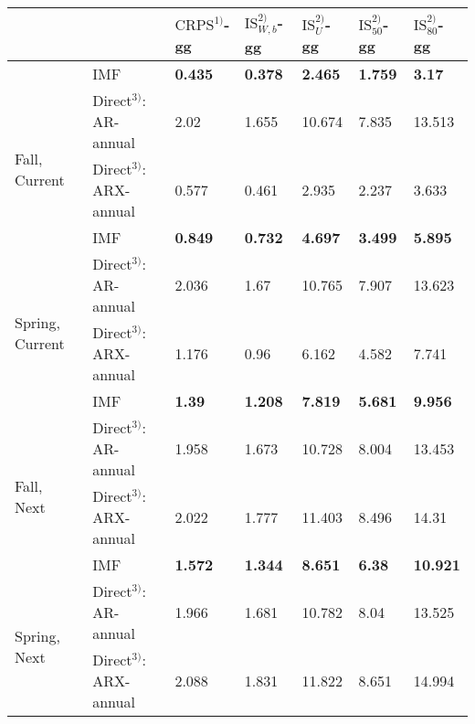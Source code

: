 \begin{table}[!h]
\centering
\begin{tabular}{lllllll}
\toprule
 &  & $\text{CRPS}^{1)}$-gg & $\text{IS}_{W,b}^{2)}$-gg & $\text{IS}_{U}^{2)}$-gg & $\text{IS}_{50}^{2)}$-gg & $\text{IS}_{80}^{2)}$-gg\\
\midrule
 & IMF & \textbf{0.435} & \textbf{0.378} & \textbf{2.465} & \textbf{1.759} & \textbf{3.17}\\
\multirow{3}{*}{Fall, Current}
 & Direct$^{3)}$: AR-annual & 2.02 & 1.655 & 10.674 & 7.835 & 13.513\\
 & Direct$^{3)}$: ARX-annual & 0.577 & 0.461 & 2.935 & 2.237 & 3.633\\
\addlinespace
 & IMF & \textbf{0.849} & \textbf{0.732} & \textbf{4.697} & \textbf{3.499} & \textbf{5.895}\\
\multirow{3}{*}{Spring, Current}
 & Direct$^{3)}$: AR-annual & 2.036 & 1.67 & 10.765 & 7.907 & 13.623\\
 & Direct$^{3)}$: ARX-annual & 1.176 & 0.96 & 6.162 & 4.582 & 7.741\\
\addlinespace
 & IMF & \textbf{1.39} & \textbf{1.208} & \textbf{7.819} & \textbf{5.681} & \textbf{9.956}\\
\multirow{3}{*}{Fall, Next}
 & Direct$^{3)}$: AR-annual & 1.958 & 1.673 & 10.728 & 8.004 & 13.453\\
 & Direct$^{3)}$: ARX-annual & 2.022 & 1.777 & 11.403 & 8.496 & 14.31\\
\addlinespace
 & IMF & \textbf{1.572} & \textbf{1.344} & \textbf{8.651} & \textbf{6.38} & \textbf{10.921}\\
\multirow{3}{*}{Spring, Next}
 & Direct$^{3)}$: AR-annual & 1.966 & 1.681 & 10.782 & 8.04 & 13.525\\
 & Direct$^{3)}$: ARX-annual & 2.088 & 1.831 & 11.822 & 8.651 & 14.994\\
\bottomrule
\end{tabular}
\end{table}
